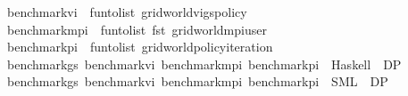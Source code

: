 \begin{isabellebody}
\isamarkupfalse%
\ {\isachardoublequoteopen}benchmark{\isacharunderscore}{\kern0pt}vi\ {\isacharequal}{\kern0pt}\ fun{\isacharunderscore}{\kern0pt}to{\isacharunderscore}{\kern0pt}list\ {\isacharparenleft}{\kern0pt}gridworld{\isacharunderscore}{\kern0pt}vi{\isacharunderscore}{\kern0pt}gs{\isacharunderscore}{\kern0pt}policy\ {}{\isachardot}{\kern0pt}{}\ {}{\isacharparenright}{\kern0pt}{\isachardoublequoteclose}\isanewline
{}\isamarkupfalse%
\ {\isachardoublequoteopen}benchmark{\isacharunderscore}{\kern0pt}mpi\ {\isacharequal}{\kern0pt}\ fun{\isacharunderscore}{\kern0pt}to{\isacharunderscore}{\kern0pt}list\ {\isacharparenleft}{\kern0pt}fst\ {\isacharparenleft}{\kern0pt}gridworld{\isacharunderscore}{\kern0pt}mpi{\isacharunderscore}{\kern0pt}user\ {}{\isachardot}{\kern0pt}{}\ {\isacharparenleft}{\kern0pt}{\isasymlambda}{\isacharunderscore}{\kern0pt}\ {\isacharunderscore}{\kern0pt}{\isachardot}{\kern0pt}\ {}{\isacharparenright}{\kern0pt}{\isacharparenright}{\kern0pt}{\isacharparenright}{\kern0pt}{\isachardoublequoteclose}\isanewline
{}\isamarkupfalse%
\ {\isachardoublequoteopen}benchmark{\isacharunderscore}{\kern0pt}pi\ {\isacharequal}{\kern0pt}\ fun{\isacharunderscore}{\kern0pt}to{\isacharunderscore}{\kern0pt}list\ {\isacharparenleft}{\kern0pt}gridworld{\isacharunderscore}{\kern0pt}policy{\isacharunderscore}{\kern0pt}iteration\ {}{\isacharparenright}{\kern0pt}{\isachardoublequoteclose}\isanewline
\isanewline
\isanewline
\isanewline
{}\isamarkupfalse%
\ benchmark{\isacharunderscore}{\kern0pt}gs\ benchmark{\isacharunderscore}{\kern0pt}vi\ benchmark{\isacharunderscore}{\kern0pt}mpi\ benchmark{\isacharunderscore}{\kern0pt}pi\ \ Haskell\ \ DP\isanewline
{}\isamarkupfalse%
\ benchmark{\isacharunderscore}{\kern0pt}gs\ benchmark{\isacharunderscore}{\kern0pt}vi\ benchmark{\isacharunderscore}{\kern0pt}mpi\ benchmark{\isacharunderscore}{\kern0pt}pi\ \ SML\ \ DP\isanewline
%
\isadelimtheory
%
\endisadelimtheory
%
\isatagtheory
{}\isamarkupfalse%
%
\endisatagtheory
{\isafoldtheory}%
%
\isadelimtheory
%
\endisadelimtheory
%
\end{isabellebody}%
\endinput

